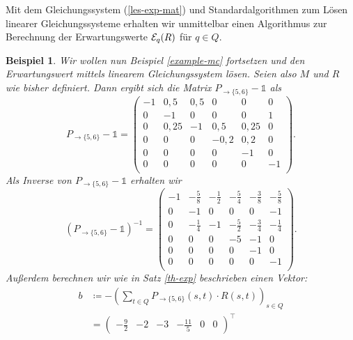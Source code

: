 \documentclass[a4paper]{article}
\newtheorem{beispiel}[satz]{Beispiel}
\theoremstyle{nonumberplain}
\begin{document}
	Mit dem Gleichungssystem (\ref{les-exp-mat}) und Standardalgorithmen zum Lösen linearer Gleichungssysteme erhalten wir unmittelbar einen Algorithmus zur Berechnung der Erwartungswerte $\mathcal{E}_q(R)$ für $q \in Q$.
	
	\begin{beispiel}\label{example-mc-exp-les}
		Wir wollen nun Beispiel \ref{example-mc} fortsetzen und den Erwartungswert mittels linearem Gleichungssystem lösen. Seien also $M$ und $R$ wie bisher definiert.
		Dann ergibt sich die Matrix $P_{\rightarrow \{5,6\}} - \mathbb{1}$ als
		\begin{equation*}
		P_{\rightarrow \{5,6\}} - \mathbb{1} = \begin{pmatrix}
		-1 & 0,5 & 0,5 & 0 & 0 & 0 \\
		0 & -1 & 0 & 0 & 0 & 1 \\
		0 & 0,25 & -1 & 0,5 & 0,25 & 0 \\
		0 & 0 & 0 & -0,2 & 0,2 & 0 \\
		0 & 0 & 0 & 0 & -1 & 0 \\
		0 & 0 & 0 & 0 & 0 & -1 \\
		\end{pmatrix}\text{.}
		\end{equation*}
		Als Inverse von $P_{\rightarrow \{5,6\}} - \mathbb{1}$ erhalten wir
		\begin{equation*}
		(P_{\rightarrow \{5,6\}} - \mathbb{1})^{-1} = \begin{pmatrix}
		-1 & -\frac{5}{8} & -\frac{1}{2} & -\frac{5}{4} & -\frac{3}{8} & -\frac{5}{8} \\
		0 & -1 & 0 & 0 & 0 & -1 \\
		0 & -\frac{1}{4} & -1 & -\frac{5}{2} & -\frac{3}{4} & -\frac{1}{4} \\
		0 & 0 & 0 & -5 & -1 & 0 \\
		0 & 0 & 0 & 0 & -1 & 0 \\
		0 & 0 & 0 & 0 & 0 & -1 \\
		\end{pmatrix}\text{.}
		\end{equation*}
		Außerdem berechnen wir wie in Satz \ref{th-exp} beschrieben einen Vektor:
		\begin{align*}
		b &\coloneqq - \left(\sum_{t \in Q}{ P_{\rightarrow \{5,6\}}(s,t) \cdot R(s,t) }\right)_{s \in Q} \\
		&= \begin{pmatrix} -\frac{9}{2} & -2 & -3 & -\frac{11}{5} & 0 & 0 \end{pmatrix}^\intercal
		\end{align*}

\end{beispiel}
\end{document}
